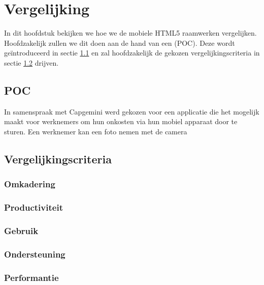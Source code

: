 \chapter{Vergelijking}
\label{chap:vergelijking}

In dit hoofdstuk bekijken we hoe we de mobiele HTML5 raamwerken vergelijken.
Hoofdzakelijk zullen we dit doen aan de hand van een  (POC).
Deze wordt geïntroduceerd in sectie \ref{sec:poc} en zal hoofdzakelijk de gekozen vergelijkingscriteria in sectie \ref{sec:vergelijkingscriteria} drijven.


\section{POC} %
\label{sec:poc}
In samenspraak met Capgemini werd gekozen voor een applicatie die het mogelijk maakt voor werknemers om hun onkosten via hun mobiel apparaat door te sturen.
Een werknemer kan een foto nemen met de camera 

\section{Vergelijkingscriteria} %
\label{sec:vergelijkingscriteria}

\subsection{Omkadering}
\subsection{Productiviteit}
\subsection{Gebruik}
\subsection{Ondersteuning}
\subsection{Performantie}